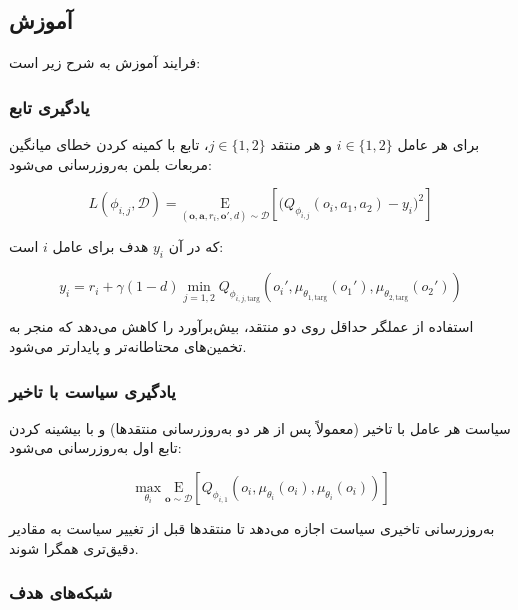 
\subsection{آموزش }

فرایند آموزش  به شرح زیر است:

\subsubsection{یادگیری تابع }

برای هر عامل $i \in \{1, 2\}$ و هر منتقد $j \in \{1, 2\}$، تابع  با کمینه کردن خطای میانگین مربعات بلمن به‌روزرسانی می‌شود:

\begin{equation}
    L(\phi_{i,j}, \mathcal{D}) = \underset{(\boldsymbol{o}, \boldsymbol{a}, r_i, \boldsymbol{o}', d) \sim \mathcal{D}}{\mathrm{E}}\left[ 
    \Bigg( Q_{\phi_{i,j}}(o_i, a_1, a_2) - y_i \Bigg)^2
    \right]
\end{equation}

که در آن $y_i$ هدف برای عامل $i$ است:

\begin{equation}
    y_i = r_i + \gamma (1 - d) \min_{j=1,2} Q_{\phi_{i,j,\text{targ}}}(o_i', \mu_{\theta_{1,\text{targ}}}(o_1'), \mu_{\theta_{2,\text{targ}}}(o_2'))
\end{equation}

استفاده از عملگر حداقل روی دو منتقد، بیش‌برآورد را کاهش می‌دهد که منجر به تخمین‌های محتاطانه‌تر و پایدارتر می‌شود.

\subsubsection{یادگیری سیاست با تاخیر}

سیاست هر عامل با تاخیر (معمولاً پس از هر دو به‌روزرسانی منتقدها) و با بیشینه کردن تابع  اول به‌روزرسانی می‌شود:

\begin{equation}
    \max_{\theta_i} \underset{\boldsymbol{o} \sim \mathcal{D}}{\mathrm{E}}\left[ Q_{\phi_{i,1}}(o_i, \mu_{\theta_i}(o_i), \mu_{\theta_{i}}(o_{i})) \right]
\end{equation}

به‌روزرسانی تاخیری سیاست اجازه می‌دهد تا منتقدها قبل از تغییر سیاست به مقادیر دقیق‌تری همگرا شوند.

\subsubsection{شبکه‌های هدف}

